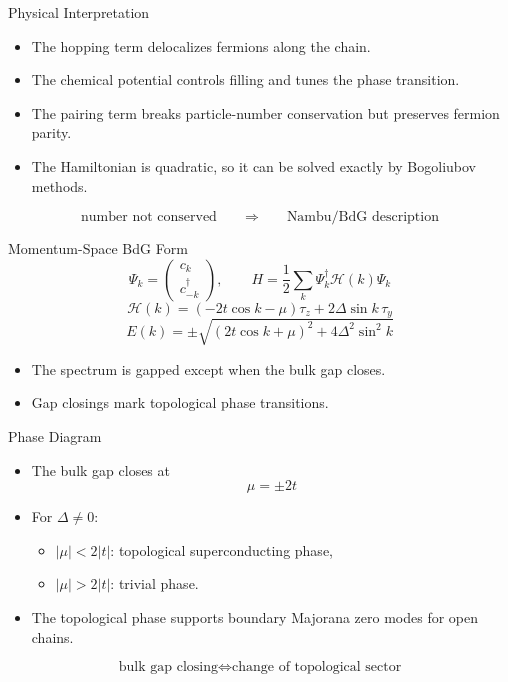 \documentclass[aspectratio=169]{beamer}
\begin{document}
\begin{frame}{Physical Interpretation}
\begin{itemize}
\item The hopping term delocalizes fermions along the chain.
\item The chemical potential controls filling and tunes the phase transition.
\item The pairing term breaks particle-number conservation but preserves fermion parity.
\item The Hamiltonian is quadratic, so it can be solved exactly by Bogoliubov methods.
\end{itemize}
\[
\text{number not conserved} \qquad \Longrightarrow \qquad \text{Nambu/BdG description}
\]
\end{frame}

\begin{frame}{Momentum-Space BdG Form}
\[
\Psi_k =
\begin{pmatrix}
c_k \\
c_{-k}^\dagger
\end{pmatrix},
\qquad
H = \frac{1}{2}\sum_k \Psi_k^\dagger \mathcal{H}(k)\Psi_k
\]
\[
\mathcal{H}(k) =
\left(-2t\cos k - \mu\right)\tau_z + 2\Delta \sin k \, \tau_y
\]
\[
E(k) = \pm \sqrt{\left(2t\cos k + \mu\right)^2 + 4\Delta^2 \sin^2 k}
\]

\begin{itemize}
\item The spectrum is gapped except when the bulk gap closes.
\item Gap closings mark topological phase transitions.
\end{itemize}
\end{frame}

\begin{frame}{Phase Diagram}
\begin{itemize}
\item The bulk gap closes at
\[
\mu = \pm 2t
\]
\item For \(\Delta \neq 0\):
\begin{itemize}
\item \(|\mu| < 2|t|\): topological superconducting phase,
\item \(|\mu| > 2|t|\): trivial phase.
\end{itemize}
\item The topological phase supports boundary Majorana zero modes for open chains.
\end{itemize}
\[
\text{bulk gap closing} \Longleftrightarrow \text{change of topological sector}
\]
\end{frame}
\end{document}
